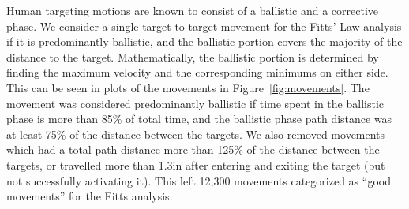 \documentclass[]{aiaa-tc}%
\begin{document}
Human targeting motions are known to consist of a ballistic and a corrective phase\cite{woodworth_accuracy_1899}.
We consider a single target-to-target movement for the Fitts' Law analysis if it is predominantly ballistic, and the ballistic portion covers the majority of the distance to the target.
Mathematically, the ballistic portion is determined by finding the maximum velocity and the corresponding minimums on either side.
This can be seen in plots of the movements in Figure~\ref{fig:movements}.
The movement was considered predominantly ballistic if time spent in the ballistic phase is more than 85\% of total time, and the ballistic phase path distance was at least 75\% of the distance between the targets.
We also removed movements which had a total path distance more than 125\% of the distance between the targets, or travelled more than 1.3in after entering and exiting the target (but not successfully activating it).
This left 12,300 movements categorized as ``good movements'' for the Fitts analysis.
\end{document}
